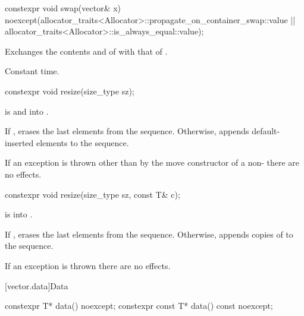 %
\begin{itemdecl}
constexpr void swap(vector& x)
  noexcept(allocator_traits<Allocator>::propagate_on_container_swap::value ||
           allocator_traits<Allocator>::is_always_equal::value);
\end{itemdecl}

\begin{itemdescr}
\pnum
\effects
Exchanges the contents and
of
with that of .

\pnum
\complexity
Constant time.
\end{itemdescr}

%
\begin{itemdecl}
constexpr void resize(size_type sz);
\end{itemdecl}

\begin{itemdescr}
\pnum
\expects
{} is
 and  into .

\pnum
\effects
If , erases the last  elements
from the sequence. Otherwise,
appends  default-inserted elements to the sequence.

\pnum
\remarks
If an exception is thrown other than by the move constructor of a non-
 there are no effects.
\end{itemdescr}

%
\begin{itemdecl}
constexpr void resize(size_type sz, const T& c);
\end{itemdecl}

\begin{itemdescr}
\pnum
\expects
{} is
 into .

\pnum
\effects
If , erases the last  elements
from the sequence. Otherwise,
appends  copies of  to the sequence.

\pnum
\remarks
If an exception is thrown there are no effects.
\end{itemdescr}

[vector.data]{Data}

%
\begin{itemdecl}
constexpr T*         data() noexcept;
constexpr const T*   data() const noexcept;
\end{itemdecl}

